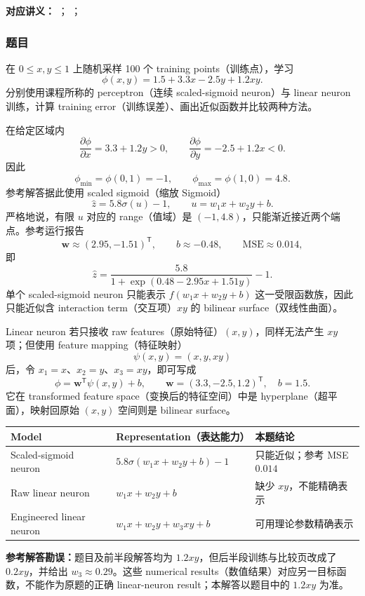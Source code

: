 \textbf{对应讲义：}
；
；

\subsubsection*{题目}

在 $0\le x,y\le1$ 上随机采样 100 个 training points（训练点），学习
\[
  \phi(x,y)=1.5+3.3x-2.5y+1.2xy.
\]
分别使用课程所称的 perceptron（连续 scaled-sigmoid neuron）与 linear neuron 训练，计算 training error（训练误差）、画出近似函数并比较两种方法。

\begin{checkedsolution}
在给定区域内
\[
  \frac{\partial\phi}{\partial x}=3.3+1.2y>0,
  \qquad
  \frac{\partial\phi}{\partial y}=-2.5+1.2x<0.
\]
因此
\[
  \phi_{\min}=\phi(0,1)=-1,\qquad
  \phi_{\max}=\phi(1,0)=4.8.
\]
参考解答据此使用 scaled sigmoid（缩放 Sigmoid）
\[
  \hat z=5.8\sigma(u)-1,\qquad
  u=w_1x+w_2y+b.
\]
严格地说，有限 $u$ 对应的 range（值域）是 $(-1,4.8)$，只能渐近接近两个端点。参考运行报告
\[
  \bm w\approx(2.95,-1.51)^{\mathsf T},\qquad
  b\approx-0.48,\qquad \mathrm{MSE}\approx0.014,
\]
即
\[
  \hat z=\frac{5.8}{1+\exp(0.48-2.95x+1.51y)}-1.
\]
单个 scaled-sigmoid neuron 只能表示 $f(w_1x+w_2y+b)$ 这一受限函数族，因此只能近似含 interaction term（交互项）$xy$ 的 bilinear surface（双线性曲面）。

Linear neuron 若只接收 raw features（原始特征）$(x,y)$，同样无法产生 $xy$ 项；但使用 feature mapping（特征映射）
\[
  \psi(x,y)=(x,y,xy)
\]
后，令 $x_1=x$、$x_2=y$、$x_3=xy$，即可写成
\[
  \boxed{\phi=\bm w^{\mathsf T}\psi(x,y)+b},\qquad
  \boxed{\bm w=(3.3,-2.5,1.2)^{\mathsf T},\quad b=1.5}.
\]
它在 transformed feature space（变换后的特征空间）中是 hyperplane（超平面），映射回原始 $(x,y)$ 空间则是 bilinear surface。

\begin{center}
\small
\begin{tabularx}{0.94\textwidth}{@{}>{\raggedright\arraybackslash}p{3.2cm}XX@{}}
  \toprule
  Model & Representation（表达能力） & 本题结论 \\
  \midrule
  Scaled-sigmoid neuron & $5.8\sigma(w_1x+w_2y+b)-1$ & 只能近似；参考 MSE $0.014$ \\
  Raw linear neuron & $w_1x+w_2y+b$ & 缺少 $xy$，不能精确表示 \\
  Engineered linear neuron & $w_1x+w_2y+w_3xy+b$ & 可用理论参数精确表示 \\
  \bottomrule
\end{tabularx}
\end{center}

\textbf{参考解答勘误：}题目及前半段解答均为 $1.2xy$，但后半段训练与比较页改成了 $0.2xy$，并给出 $w_3\approx0.29$。这些 numerical results（数值结果）对应另一目标函数，不能作为原题的正确 linear-neuron result；本解答以题目中的 $1.2xy$ 为准。
\end{checkedsolution}

